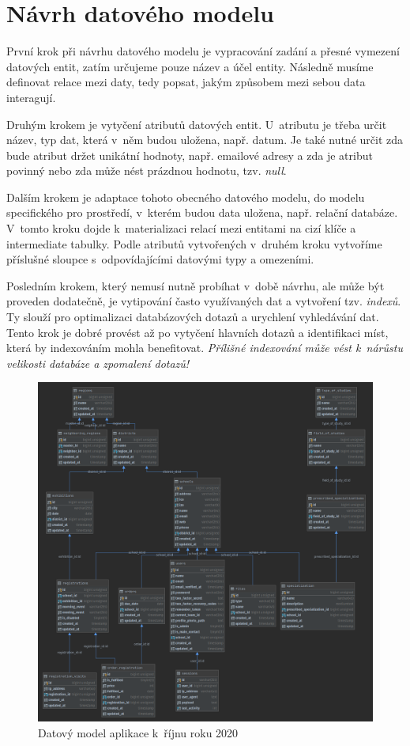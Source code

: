 \section{Návrh datového modelu}
\label{sub:data-model}

První krok\cite{data-model} při návrhu datového modelu je vypracování zadání a přesné vymezení datových entit, zatím určujeme pouze název a účel entity. Následně musíme definovat relace mezi daty, tedy popsat, jakým způsobem mezi sebou data interagují.

Druhým krokem je vytyčení atributů datových entit. U~atributu je třeba určit název, typ dat, která v~něm budou uložena, např. datum. Je také nutné určit zda bude atribut držet unikátní hodnoty, např. emailové adresy a zda je atribut povinný nebo zda může nést prázdnou hodnotu, tzv. \emph{null}\cite{null}.

Dalším krokem je adaptace tohoto obecného datového modelu, do modelu specifického pro prostředí, v~kterém budou data uložena, např. relační databáze. V~tomto kroku dojde k~materializaci relací mezi entitami na cizí klíče a intermediate tabulky\cite{intermediate-table}. Podle atributů vytvořených v~druhém kroku vytvoříme příslušné sloupce s~odpovídajícími datovými typy a omezeními. 

Posledním krokem, který nemusí nutně probíhat v~době návrhu, ale může být proveden dodatečně, je vytipování často využívaných dat a vytvoření tzv. \emph{indexů}\cite{index}. Ty slouží pro optimalizaci databázových dotazů a urychlení vyhledávání dat. Tento krok je dobré provést až po vytyčení hlavních dotazů a identifikaci míst, která by indexováním mohla benefitovat. \emph{Přílišné indexování může vést k~nárůstu velikosti databáze a zpomalení dotazů!}\cite{bad-indexing}

\begin{figure}[h]
\centering
\includegraphics[width=\textwidth]{img/datovy-model-rijen-2020-2.png}
\caption{Datový model aplikace \bso{} k~říjnu roku 2020}
\label{fig:data-model-2020}
\end{figure}

